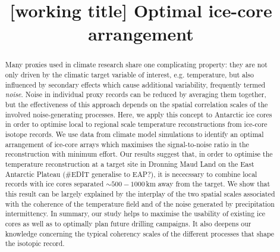 \documentclass[cp, manuscript]{copernicus}
\begin{document}
\title{[working title] Optimal ice-core arrangement}




\received{}
\pubdiscuss{}
\revised{}
\accepted{}
\published{}


\maketitle

\begin{abstract} Many proxies used in climate research share one complicating
property: they are not only driven by the climatic target variable of interest,
e.g. temperature, but also influenced by secondary effects which cause
additional variability, frequently termed \emph{noise}. Noise in individual
proxy records can be reduced by averaging them together, but the effectiveness
of this approach depends on the spatial correlation scales of the involved
noise-generating processes. Here, we apply this concept to Antarctic ice cores
in order to optimise local to regional scale temperature reconstructions from
ice-core isotope records. We use data from climate model simulations to identify
an optimal arrangement of ice-core arrays which maximises the signal-to-noise
ratio in the reconstruction with minimum effort. Our results suggest that, in
order to optimise the temperature reconstruction at a target site in Dronning
Maud Land on the East Antarctic Plateau (\#EDIT generalise to EAP?), it is
nececssary to combine local records with ice cores separated $\sim500-1000$\,km
away from the target. We show that this result can be largely explained by the
interplay of the two spatial scales associated with the coherence of the
temperature field and of the noise generated by precipitation intermittency. In
summary, our study helps to maximise the usability of existing ice cores as well
as to optimally plan future drilling campaigns. It also deepens our knowledge
concerning the typical coherency scales of the different processes that shape
the isotopic record.
\end{abstract}
\end{document}
